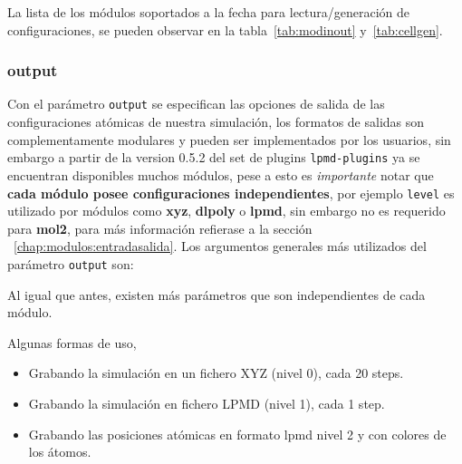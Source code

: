 La lista de los m\'odulos soportados a la fecha para lectura/generaci\'on de configuraciones, se pueden observar en la tabla~\ref{tab:modinout} y~\ref{tab:cellgen}.

\subsubsection{output}

Con el par\'ametro \verb|output| se especifican las opciones de salida de las configuraciones at\'omicas de nuestra simulaci\'on, los formatos de salidas son complementamente modulares y pueden ser implementados por los usuarios, sin embargo a partir de la version 0.5.2 del set de plugins \verb|lpmd-plugins| ya se encuentran disponibles muchos m\'odulos, pese a esto es \textit{importante} notar que \textbf{cada m\'odulo posee configuraciones independientes}, por ejemplo \verb|level| es utilizado por m\'odulos como \textbf{xyz}, \textbf{dlpoly} o \textbf{lpmd}, sin embargo no es requerido para \textbf{mol2}, para m\'as informaci\'on refierase a la secci\'on ~\ref{chap:modulos:entradasalida}. Los argumentos generales m\'as utilizados del par\'ametro \verb|output| son:


Al igual que antes, existen m\'as par\'ametros que son independientes de cada m\'odulo.

Algunas formas de uso,

\begin{itemize}
 \item Grabando la simulaci\'on en un fichero XYZ (nivel 0), cada 20 steps.
 \item Grabando la simulaci\'on en fichero LPMD (nivel 1), cada 1 step.
 \item Grabando las posiciones at\'omicas en formato lpmd nivel 2 y con colores de los \'atomos.
\end{itemize}

